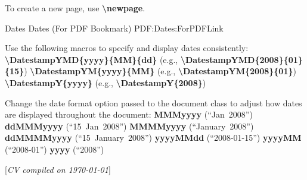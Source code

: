 \documentclass[letterpaper,MMMyyyy,nonstopmode]{simpleresumecv}
\newcommand{\CVNote}{CV compiled on {\today}}
\newcommand{\Code}[1]{\mbox{\textbf{#1}}}
\newcommand{\CodeCommand}[1]{\mbox{\textbf{\textbackslash{#1}}}}
\begin{document}
\begin{Body}
\Gap
\BulletItem
To create a new page, use \CodeCommand{newpage}.

\BigGap
\SubSection
{Dates}
{Dates (For PDF Bookmark)}
{PDF:Dates:ForPDFLink}

\BigGap
\BulletItem
Use the following macros to specify and display dates consistently:
\SubBulletItem
\CodeCommand{DatestampYMD\{yyyy\}\{MM\}\{dd\}}
(e.g., \CodeCommand{DatestampYMD\{2008\}\{01\}\{15\}})
\SubBulletItem
\CodeCommand{DatestampYM\{yyyy\}\{MM\}}
(e.g., \CodeCommand{DatestampYM\{2008\}\{01\}})
\SubBulletItem
\CodeCommand{DatestampY\{yyyy\}}
(e.g., \CodeCommand{DatestampY\{2008\}})

\Gap
\BulletItem
Change the date format option passed to the document class to adjust how dates are displayed throughout the document:
\SubBulletItem
\Code{MMMyyyy} (``Jan~2008'')
\SubBulletItem
\Code{ddMMMyyyy} (``15~Jan~2008'')
\SubBulletItem
\Code{MMMMyyyy} (``January~2008'')
\SubBulletItem
\Code{ddMMMMyyyy} (``15~January~2008'')
\SubBulletItem
\Code{yyyyMMdd} (``2008-01-15'')
\SubBulletItem
\Code{yyyyMM} (``2008-01'')
\SubBulletItem
\Code{yyyy} (``2008'')

\endgroup

\end{Body}


\BigGap
\UseNoteFont%
\null\hfill%
[\textit{\CVNote}]
\end{document}
